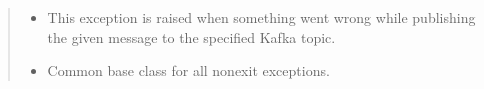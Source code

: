 \documentclass[letterpaper,10pt,english]{sphinxmanual}
\begin{document}
\begin{fulllineitems}
\begin{quote}
\begin{description}
\begin{itemize}
\item {} 
\sphinxAtStartPar
{\hyperref[\detokenize{Forge:Forge.KafkaProductionError}]{}} \textendash{} This exception is raised when something went wrong while publishing the given message to
    the specified Kafka topic.

\item {} 
\sphinxAtStartPar
{} \textendash{} Common base class for all non\sphinxhyphen{}exit exceptions.

\end{itemize}

\end{description}\end{quote}

\end{fulllineitems}

\end{document}
